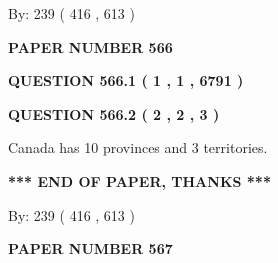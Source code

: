 \documentclass[12pt]{article}
\begin{document}
   
\hspace{1.0in} By: 
 239 ( 416 ,  613 )
   
   
   
   
\newpage 
\setcounter{page}{ 
   566001 } 
   
   
   
   
 {\textbf{ \Large{ PAPER NUMBER  566  }}}
   
   
\vspace{0.2in}
   
   
   
   
   
   
 \vspace{0.2in}
 
 
 
 
   
   
  
\vspace{0.2in}
  
{\textbf{\Large{QUESTION
566.1 
 ( 1 , 1 , 6791 )
}}}
  
  
  
\vspace{0.2in}
  
{\textbf{\Large{QUESTION
566.2 
 ( 2 , 2 , 3 )
}}}
  
  
 
 
\noindent{}
 
 
Canada has 10  provinces and 3 territories.
 
 
 
 
   
   
 \vspace{0.2in}
 
   
   
   
   
\vspace{1.0in} 
{\textbf{\large{ *** END OF PAPER, THANKS *** }}} 
   
   
\hspace{1.0in} By: 
 239 ( 416 ,  613 )
   
   
   
   
\newpage 
\setcounter{page}{ 
   567001 } 
   
   
   
   
 {\textbf{ \Large{ PAPER NUMBER  567  }}}
   
\end{document}
